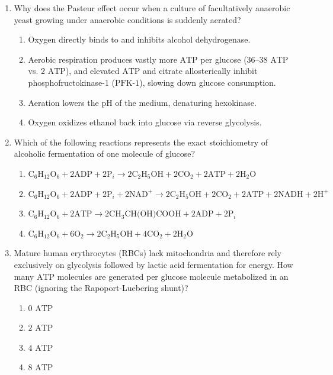 \documentclass[11pt, a4paper]{article}
\begin{document}
\begin{enumerate}[label=\textbf{\arabic*.}]
\item Why does the Pasteur effect occur when a culture of facultatively anaerobic yeast growing under anaerobic conditions is suddenly aerated?
\begin{enumerate}[label=(\Alph*)]
    \item Oxygen directly binds to and inhibits alcohol dehydrogenase.
    \item Aerobic respiration produces vastly more $\text{ATP}$ per glucose ($36\text{--}38\text{ ATP}$ vs. $2\text{ ATP}$), and elevated $\text{ATP}$ and citrate allosterically inhibit phosphofructokinase-1 ($\text{PFK-1}$), slowing down glucose consumption.
    \item Aeration lowers the pH of the medium, denaturing hexokinase.
    \item Oxygen oxidizes ethanol back into glucose via reverse glycolysis.
\end{enumerate}

\item Which of the following reactions represents the exact stoichiometry of alcoholic fermentation of one molecule of glucose?
\begin{enumerate}[label=(\Alph*)]
    \item $\text{C}_6\text{H}_{12}\text{O}_6 + 2\text{ADP} + 2\text{P}_i \rightarrow 2\text{C}_2\text{H}_5\text{OH} + 2\text{CO}_2 + 2\text{ATP} + 2\text{H}_2\text{O}$
    \item $\text{C}_6\text{H}_{12}\text{O}_6 + 2\text{ADP} + 2\text{P}_i + 2\text{NAD}^+ \rightarrow 2\text{C}_2\text{H}_5\text{OH} + 2\text{CO}_2 + 2\text{ATP} + 2\text{NADH} + 2\text{H}^+$
    \item $\text{C}_6\text{H}_{12}\text{O}_6 + 2\text{ATP} \rightarrow 2\text{CH}_3\text{CH(OH)COOH} + 2\text{ADP} + 2\text{P}_i$
    \item $\text{C}_6\text{H}_{12}\text{O}_6 + 6\text{O}_2 \rightarrow 2\text{C}_2\text{H}_5\text{OH} + 4\text{CO}_2 + 2\text{H}_2\text{O}$
\end{enumerate}

\item Mature human erythrocytes (RBCs) lack mitochondria and therefore rely exclusively on glycolysis followed by lactic acid fermentation for energy. How many $\text{ATP}$ molecules are generated per glucose molecule metabolized in an RBC (ignoring the Rapoport-Luebering shunt)?
\begin{enumerate}[label=(\Alph*)]
    \item $0\text{ ATP}$
    \item $2\text{ ATP}$
    \item $4\text{ ATP}$
    \item $8\text{ ATP}$
\end{enumerate}


\end{enumerate}
\end{document}
